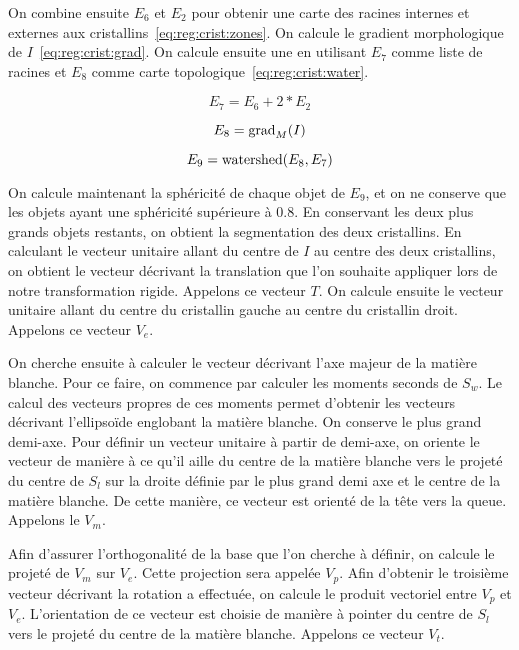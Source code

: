 \documentclass[\main/main.tex]{subfiles}
\begin{document}
%
On combine ensuite $E_6$ et $E_2$ pour obtenir une carte des racines internes et externes aux cristallins~\eqref{eq:reg:crist:zones}.
%
On calcule le gradient morphologique de $I$~\eqref{eq:reg:crist:grad}.
%
On calcule ensuite une \watershed{} en utilisant $E_7$ comme liste de racines et $E_8$ comme carte topologique~\eqref{eq:reg:crist:water}.

\begin{equation}
    \label{eq:reg:crist:zones}
    E_7= E_6 + 2 * E_2
\end{equation}

\begin{equation}
    \label{eq:reg:crist:grad}
    E_8= \operatorname{\textnormal{grad}}_M(I)
\end{equation}

\begin{equation}
    \label{eq:reg:crist:water}
    E_9= \operatorname{\textnormal{watershed}}(E_8,E_7)
\end{equation}

%
On calcule maintenant la sphéricité de chaque objet de $E_9$, et on ne conserve que les objets ayant une sphéricité supérieure à $0.8$.
%
En conservant les deux plus grands objets restants, on obtient la segmentation des deux cristallins.
%
En calculant le vecteur unitaire allant du centre de $I$ au centre des deux cristallins, on obtient le vecteur décrivant la translation que l'on souhaite appliquer lors de notre transformation rigide. Appelons ce vecteur $T$.
%
On calcule ensuite le vecteur unitaire allant du centre du cristallin gauche au centre du cristallin droit.
%
Appelons ce vecteur $V_e$.

%
On cherche ensuite à calculer le vecteur décrivant l'axe majeur de la matière blanche.
%
Pour ce faire, on commence par calculer les moments seconds de $S_w$.
%
Le calcul des vecteurs propres de ces moments permet d'obtenir les vecteurs décrivant l'ellipsoïde englobant la matière blanche.
%
On conserve le plus grand demi-axe.
%
Pour définir un vecteur unitaire à partir de demi-axe,
on oriente le vecteur de manière à ce qu'il aille du centre de la matière blanche vers le projeté du centre de $S_l$ sur la droite définie par le plus grand demi axe et le centre de la matière blanche.
%
De cette manière, ce vecteur est orienté de la tête vers la queue.
%
Appelons le $V_m$.

%
Afin d'assurer l'orthogonalité de la base que l'on cherche à définir, on calcule le projeté de $V_m$ sur $V_e$.
%
Cette projection sera appelée  $V_p$.
%
Afin d'obtenir le troisième vecteur décrivant la rotation a effectuée, on calcule le produit vectoriel entre $V_p$ et $V_e$.
%
L'orientation de ce vecteur est choisie de manière à pointer du centre de $S_l$ vers le projeté du centre de la matière blanche.
%
Appelons ce vecteur $V_t$.
\end{document}
